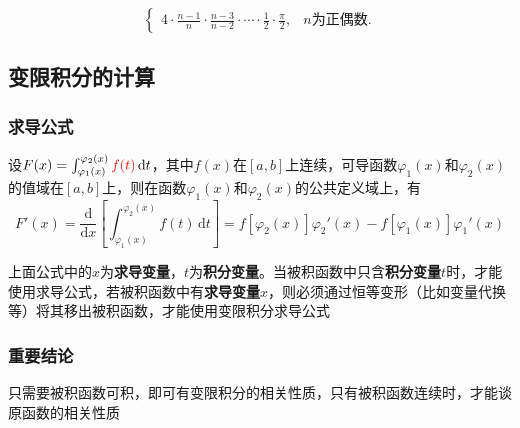 \documentclass[a4paper,12pt]{article}
\begin{document}
\begin{enumerate}
\begin{itemize}
\[\begin{cases}
                    \displaystyle
                    4
                    \cdot
                    \frac{n-1}{n}
                    \cdot
                    \frac{n-3}{n-2}
                    \cdot
                    \cdots
                    \cdot
                    \frac{1}{2}
                    \cdot
                    \frac{\pi}{2},
                    & n \text{为正偶数}.
                \end{cases}
            \]
        \end{itemize}
    \end{enumerate}

    \subsection{变限积分的计算}

    \subsubsection{求导公式}

    设$F(x) = \int_{\varphi_1(x)}^{\varphi_2(x)} {\color{red}{f(t)}}\,\mathrm{d}t$，其中$f(x)$在$[a, b]$上连续，可导函数$\varphi_1(x)$和$\varphi_2(x)$的值域在$[a, b]$上，则在函数$\varphi_1(x)$和$\varphi_2(x)$的公共定义域上，有
    \[
        F'(x) = \frac{\mathrm{d}}{\mathrm{d}x}\left[\int_{\varphi_1(x)}^{\varphi_2(x)} f(t)\,\mathrm{d}t\right] = f[\varphi_2(x)]\varphi_2'(x) - f[\varphi_1(x)]\varphi_1'(x)
    \]

    上面公式中的$x$为\textbf{求导变量}，$t$为\textbf{积分变量}。当被积函数中只含\textbf{积分变量}$t$时，才能使用求导公式，若被积函数中有\textbf{求导变量}$x$，则必须通过恒等变形（比如变量代换等）将其移出被积函数，才能使用变限积分求导公式

    \subsubsection{重要结论}

    只需要被积函数可积，即可有变限积分的相关性质，只有被积函数连续时，才能谈原函数的相关性质
\end{document}
